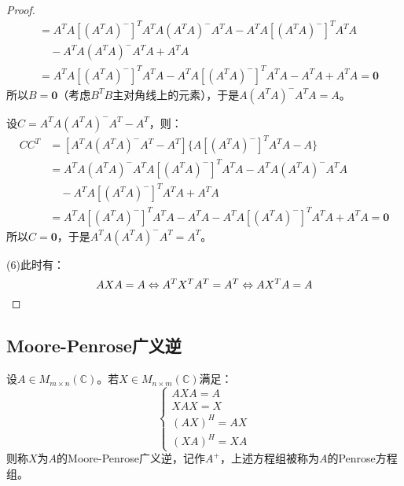 \begin{proof}
\begin{align*}
		&=A^TA[(A^TA)^-]^TA^TA(A^TA)^-A^TA-A^TA[(A^TA)^-]^TA^TA \\
		&\quad-A^TA(A^TA)^-A^TA+A^TA \\
		&=A^TA[(A^TA)^-]^TA^TA-A^TA[(A^TA)^-]^TA^TA-A^TA+A^TA=\mathbf{0}
	\end{align*}
	所以$B=\mathbf{0}$（考虑$B^TB$主对角线上的元素），于是$A(A^TA)^-A^TA=A$。\par
	设$C=A^TA(A^TA)^-A^T-A^T$，则：
	\begin{align*}
		CC^T
		&=[A^TA(A^TA)^-A^T-A^T]\{A[(A^TA)^-]^TA^TA-A\} \\
		&=A^TA(A^TA)^-A^TA[(A^TA)^-]^TA^TA-A^TA(A^TA)^-A^TA \\
		&\quad-A^TA[(A^TA)^-]^TA^TA+A^TA \\
		&=A^TA[(A^TA)^-]^TA^TA-A^TA-A^TA[(A^TA)^-]^TA^TA+A^TA=\mathbf{0}
	\end{align*}
	所以$C=\mathbf{0}$，于是$A^TA(A^TA)^-A^T=A^T$。\par
	(6)此时有：
	\begin{equation*}
		AXA=A\Leftrightarrow A^TX^TA^T=A^T\Leftrightarrow AX^TA=A\qedhere
	\end{equation*}
\end{proof}

\subsection{Moore-Penrose广义逆}
\begin{definition}
	设$A\in M_{m\times n}(\mathbb{C})$。若$X\in M_{n\times m}(\mathbb{C})$满足：
	\begin{equation*}
		\begin{cases}
			AXA=A \\
			XAX=X \\
			(AX)^H=AX \\
			(XA)^H=XA
		\end{cases}
	\end{equation*}
	则称$X$为$A$的Moore-Penrose广义逆，记作$A^+$，上述方程组被称为$A$的Penrose方程组。
\end{definition}
